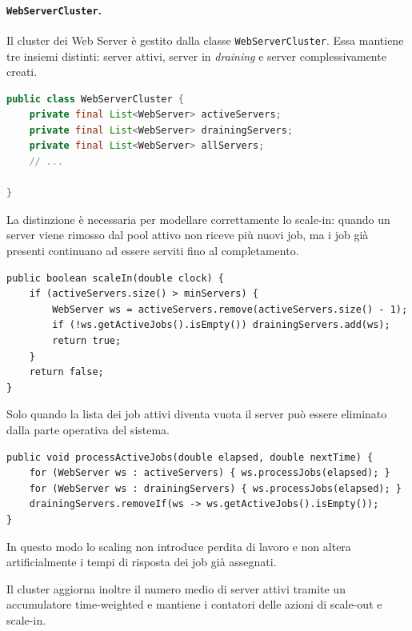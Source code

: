 ﻿\documentclass[a4paper,12pt]{article}
\begin{document}
\paragraph{\texttt{WebServerCluster}.}
Il cluster dei Web Server è gestito dalla classe \texttt{WebServerCluster}. Essa mantiene tre insiemi distinti: server attivi, server in \textit{draining} e server complessivamente creati.
\begin{lstlisting}[language=Java]
public class WebServerCluster {
    private final List<WebServer> activeServers;
    private final List<WebServer> drainingServers;
    private final List<WebServer> allServers;
    // ...

}
\end{lstlisting}
La distinzione è necessaria per modellare correttamente lo scale-in: quando un server viene rimosso dal pool attivo non riceve più nuovi job, ma i job già presenti continuano ad essere serviti fino al completamento.
\begin{lstlisting}
public boolean scaleIn(double clock) {
    if (activeServers.size() > minServers) {
        WebServer ws = activeServers.remove(activeServers.size() - 1);
        if (!ws.getActiveJobs().isEmpty()) drainingServers.add(ws);
        return true;
    }
    return false;
}
\end{lstlisting}
Solo quando la lista dei job attivi diventa vuota il server può essere eliminato dalla parte operativa del sistema.
\begin{lstlisting}
public void processActiveJobs(double elapsed, double nextTime) {
    for (WebServer ws : activeServers) { ws.processJobs(elapsed); }
    for (WebServer ws : drainingServers) { ws.processJobs(elapsed); }
    drainingServers.removeIf(ws -> ws.getActiveJobs().isEmpty());
}
\end{lstlisting}
In questo modo lo scaling non introduce perdita di lavoro e non altera artificialmente i tempi di risposta dei job già assegnati.

Il cluster aggiorna inoltre il numero medio di server attivi tramite un accumulatore time-weighted e mantiene i contatori delle azioni di scale-out e scale-in.
\end{document}
